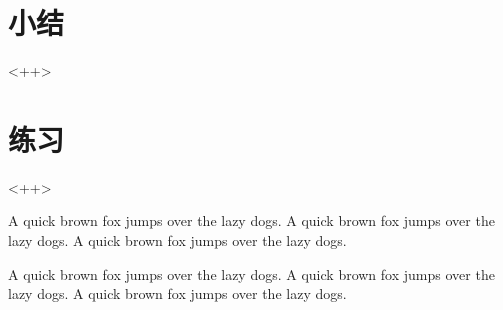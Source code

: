 \section{小结}<++>

\section{练习}<++>

A quick brown fox jumps over the lazy dogs.
A quick brown fox jumps over the lazy dogs.
A quick brown fox jumps over the lazy dogs.

A quick brown fox jumps over the lazy dogs.
A quick brown fox jumps over the lazy dogs.
A quick brown fox jumps over the lazy dogs.


